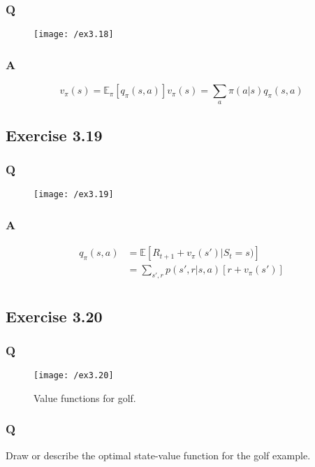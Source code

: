 \subsubsection*{Q}
\begin{figure}[h!]
	\centering
	\texttt{[image: /ex3.18]}
	\label{fig:3.18}
\end{figure}

\subsubsection*{A}
\begin{equation}
v_\pi(s) = \mathbb{E}_\pi \left[q_\pi(s,a)\right] 
v_\pi(s) = \sum_{a} \pi(a|s) q_\pi(s,a)
\end{equation}

\subsection{Exercise 3.19}
\subsubsection*{Q}
\begin{figure}[h!]
	\centering
	\texttt{[image: /ex3.19]}
	\label{fig:3.19}
\end{figure}

\subsubsection*{A}
\begin{align}
q_\pi(s, a) &= \mathbb{E} \left[R_{t+1} + v_\pi(s') | S_{t} = s)\right] \\
&= \sum_{s', r} p(s', r | s, a) [r +v_\pi(s')] \\
\end{align}

\subsection{Exercise 3.20}
\subsubsection*{Q}
\begin{figure}[h!]
	\centering
	\texttt{[image: /ex3.20]}
	\caption{Value functions for golf.}
	\label{fig:3.20}
\end{figure}
\subsubsection*{Q}
Draw or describe the optimal state-value function for the golf example.

